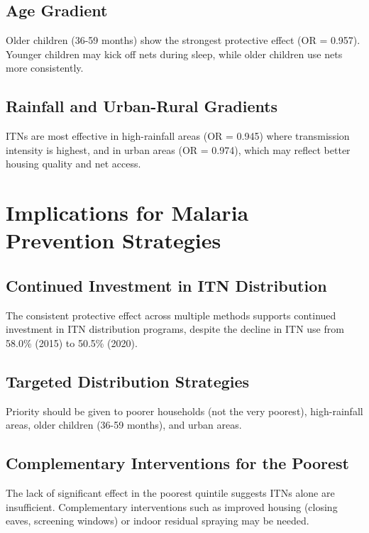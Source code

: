 \subsection{Age Gradient}

Older children (36-59 months) show the strongest protective effect (OR = 0.957). Younger children may kick off nets during sleep, while older children use nets more consistently.

\subsection{Rainfall and Urban-Rural Gradients}

ITNs are most effective in high-rainfall areas (OR = 0.945) where transmission intensity is highest, and in urban areas (OR = 0.974), which may reflect better housing quality and net access.

\section{Implications for Malaria Prevention Strategies}

\subsection{Continued Investment in ITN Distribution}

The consistent protective effect across multiple methods supports continued investment in ITN distribution programs, despite the decline in ITN use from 58.0\% (2015) to 50.5\% (2020).

\subsection{Targeted Distribution Strategies}

Priority should be given to poorer households (not the very poorest), high-rainfall areas, older children (36-59 months), and urban areas.

\subsection{Complementary Interventions for the Poorest}

The lack of significant effect in the poorest quintile suggests ITNs alone are insufficient. Complementary interventions such as improved housing (closing eaves, screening windows) or indoor residual spraying may be needed.


